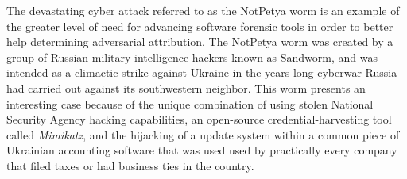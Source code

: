\documentclass[12pt]{report}
\begin{document}

The devastating cyber attack referred to as the NotPetya worm is an example of the greater level of need for advancing software forensic tools in order to better help determining adversarial attribution.  The NotPetya worm was created by a group of Russian military intelligence hackers known as Sandworm, and was intended as a climactic strike against Ukraine in the years-long cyberwar Russia had carried out against its southwestern neighbor.  This worm presents an interesting case because of the unique combination of using stolen National Security Agency hacking capabilities, an open-source credential-harvesting tool called \emph{Mimikatz}, and the hijacking of a update system within a common piece of Ukrainian accounting software that was used used by practically every company that filed taxes or had business ties in the country.  \cite{greenberg2018untold}
\end{document}

